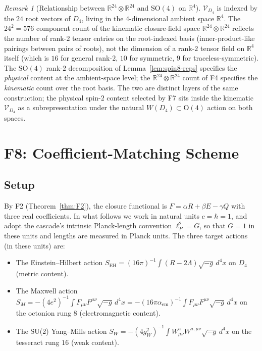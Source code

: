 \documentclass[12pt]{article}
\theoremstyle{definition}
\theoremstyle{remark}
\newtheorem{remark}[theorem]{Remark}
\newcommand{\Vcal}{\mathcal{V}}
\begin{document}
\begin{remark}[Relationship between $\mathbb{R}^{24}\otimes\mathbb{R}^{24}$ and $\mathrm{SO}(4)$ on $\mathbb{R}^4$]\label{rem:R24-vs-R4}
$\Vcal_{D_4}$ is indexed by the $24$ root vectors of $D_4$, living in the $4$-dimensional ambient space $\mathbb{R}^4$. The $24^2 = 576$ component count of the kinematic closure-field space $\mathbb{R}^{24}\otimes\mathbb{R}^{24}$ reflects the number of rank-$2$ tensor entries on the root-indexed basis (inner-product-like pairings between pairs of roots), not the dimension of a rank-$2$ tensor field on $\mathbb{R}^4$ itself (which is $16$ for general rank-$2$, $10$ for symmetric, $9$ for traceless-symmetric). The $\mathrm{SO}(4)$ rank-$2$ decomposition of Lemma~\ref{lem:spin8-reps} specifies the \emph{physical} content at the ambient-space level; the $\mathbb{R}^{24}\otimes\mathbb{R}^{24}$ count of F4 specifies the \emph{kinematic} count over the root basis. The two are distinct layers of the same construction; the physical spin-$2$ content selected by F7 sits inside the kinematic $\Vcal_{D_4}$ as a subrepresentation under the natural $W(D_4) \subset \mathrm{O}(4)$ action on both spaces.
\end{remark}

\section{F8: Coefficient-Matching Scheme}\label{sec:F8}

\subsection{Setup}

By F2 (Theorem~\ref{thm:F2}), the closure functional is $F = \alpha R + \beta E - \gamma Q$ with three real coefficients. In what follows we work in natural units $c = \hbar = 1$, and adopt the cascade's intrinsic Planck-length convention $\ell_P^2 = G$, so that $G = 1$ in these units and lengths are measured in Planck units. The three target actions (in these units) are:

\begin{itemize}
\item The Einstein--Hilbert action $S_{\mathrm{EH}} = (16\pi)^{-1} \int (R - 2\Lambda) \sqrt{-g}\, d^4 x$ on $D_4$ (metric content).
\item The Maxwell action $S_M = -(4e^2)^{-1} \int F_{\mu\nu} F^{\mu\nu} \sqrt{-g}\, d^4 x = -(16\pi \alpha_{\mathrm{em}})^{-1} \int F_{\mu\nu} F^{\mu\nu} \sqrt{-g}\, d^4 x$ on the octonion rung $8$ (electromagnetic content).
\item The SU(2) Yang--Mills action $S_W = -(4 g_W^2)^{-1} \int W^a_{\mu\nu} W^{a,\mu\nu} \sqrt{-g}\, d^4 x$ on the tesseract rung $16$ (weak content).
\end{itemize}
\end{document}
